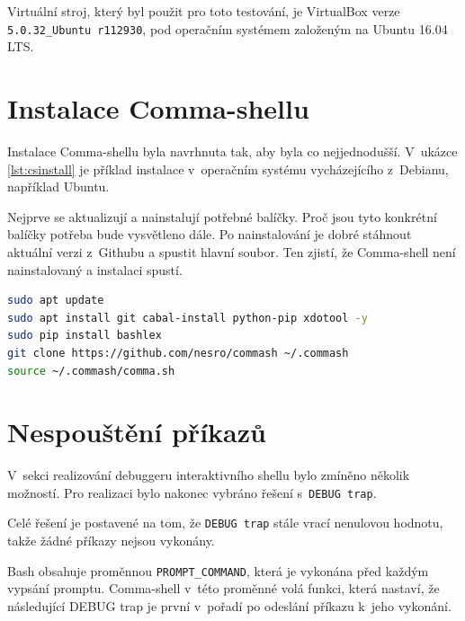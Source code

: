\documentclass[thesis=M,czech]{FITthesis}[2012/06/26]
\begin{document}
Virtuální stroj, který byl použit pro toto testování, je VirtualBox verze \texttt{5.0.32\_Ubuntu r112930}, pod operačním systémem založeným na Ubuntu 16.04 LTS.




\section{Instalace Comma-shellu}

Instalace Comma-shellu byla navrhnuta tak, aby byla co nejjednodušší. V~uká\-zce \ref{lst:csinstall} je příklad instalace v~operačním systému vycházejícího z~Debianu, například Ubuntu.

Nejprve se aktualizují a nainstalují potřebné balíčky. Proč jsou tyto konkrétní balíčky potřeba bude vysvětleno dále. Po nainstalování je dobré stáhnout aktuální verzi z~Githubu a spustit hlavní soubor. Ten zjistí, že Comma-shell není nainstalovaný a instalaci spustí.

\noindent
\begin{minipage}{\linewidth}
\begin{lstlisting}[language=bash, caption={Instalace Comma-shellu}, label={lst:csinstall}]
sudo apt update
sudo apt install git cabal-install python-pip xdotool -y
sudo pip install bashlex
git clone https://github.com/nesro/commash ~/.commash
source ~/.commash/comma.sh
\end{lstlisting}
\end{minipage}



%
%
%
%
%
\section{Nespouštění příkazů}\label{sec:debugtraprealization}
V~sekci realizování debuggeru interaktivního shellu bylo zmíněno několik možností. Pro realizaci bylo nakonec vybráno řešení s~\texttt{DEBUG trap}.

Celé řešení je postavené na tom, že \texttt{DEBUG trap} stále vrací nenulovou hodnotu, takže žádné příkazy nejsou vykonány.

Bash obsahuje proměnnou \texttt{PROMPT\_COMMAND}, která je vykonána před každým vypsání promptu. Comma-shell v~této proměnné volá funkci, která nastaví, že následující DEBUG trap je první v~pořadí po odeslání příkazu k~jeho vykonání.
\end{document}
